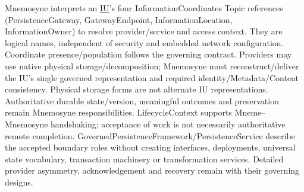 Mnemosyne interprets an \hyperref[element:74ec609de1ae498fbf9d13e4ef8c6cbe]{IU}'s four InformationCoordinates Topic references (PersistenceGateway, GatewayEndpoint, InformationLocation, InformationOwner) to resolve provider/service and access context. They are logical names, independent of security and embedded network configuration. Coordinate presence/population follows the governing contract. Providers may use native physical storage/decomposition; Mnemosyne must reconstruct/deliver the IU's single governed representation and required identity/Metadata/Content consistency. Physical storage forms are not alternate IU representations. Authoritative durable state/version, meaningful outcomes and preservation remain Mnemosyne responsibilities. LifecycleContext supports Mneme–Mnemosyne handshaking; acceptance of work is not necessarily authoritative remote completion. GovernedPersistenceFramework/PersistenceService describe the accepted boundary roles without creating interfaces, deployments, universal state vocabulary, transaction machinery or transformation services. Detailed provider asymmetry, acknowledgement and recovery remain with their governing designs.



